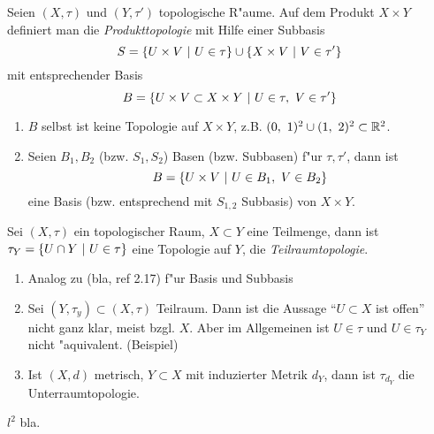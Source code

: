 \documentclass{skript}
\begin{document}
\begin{dfn}
    Seien $(X,\tau)$ und $(Y, \tau')$ topologische R"aume. Auf dem Produkt
    $X\times Y$ definiert man die \emph{Produkttopologie} mit Hilfe einer
    Subbasis
    \[S = \mdef[U\times V]{U\in\tau} \cup \mdef[X\times V]{V\in\tau'}\]
    mit entsprechender Basis
    \[B = \mdef[U\times V \subset X\times Y]{U\in\tau,\ V\in\tau'}\]

    \begin{bem}
        \begin{enumerate}
            \item $B$ selbst ist keine Topologie auf $X\times Y$, z.B. $(0,\ 1)^2
                \cup (1,\ 2)^2 \subset \mathbb{R}^2$.
            \item Seien $B_1, B_2$ (bzw. $S_1, S_2$) Basen (bzw. Subbasen) f"ur
                $\tau,\tau'$, dann ist
                \[B = \mdef[U\times V]{U\in B_1,\ V\in B_2}\]
                eine Basis (bzw. entsprechend mit $S_{1,2}$ Subbasis) von $X\times Y$.
        \end{enumerate}
    \end{bem}
\end{dfn}

\begin{dfn}
    Sei $(X,\tau)$ ein topologischer Raum, $X\subset Y$ eine Teilmenge, dann ist
    $\tau_Y = \mdef[U\cap Y]{U\in\tau}$ eine Topologie auf $Y$, die
    \emph{Teilraumtopologie}.

    \begin{bem}
        \begin{enumerate}
            \item Analog zu (bla, ref 2.17) f"ur Basis und Subbasis
            \item Sei $(Y,\tau_y) \subset (X,\tau)$ Teilraum. Dann ist die Aussage
                "`$U\subset X$ ist offen"' nicht ganz klar, meist bzgl. $X$. Aber
                im Allgemeinen ist $U\in\tau$ und $U\in\tau_Y$ nicht "aquivalent.
                (Beispiel)
            \item Ist $(X,d)$ metrisch, $Y\subset X$ mit induzierter Metrik $d_Y$,
                dann ist $\tau_{d_Y}$ die Unterraumtopologie.
        \end{enumerate}
    \end{bem}
\end{dfn}

\begin{bsp}
    $l^2$ bla.
\end{bsp}
\end{document}
